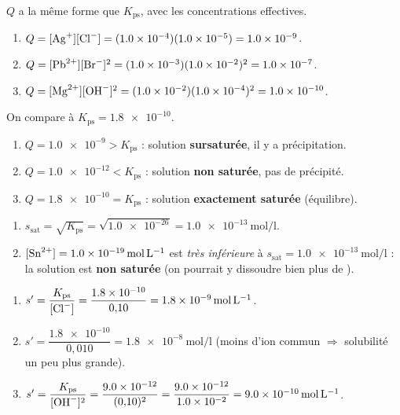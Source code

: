 \documentclass[11pt,a4paper]{article}
\begin{document}
\begin{corrige}
$Q$ a la même forme que $K_{\mathrm{ps}}$, avec les concentrations effectives.
\begin{enumerate}[label=\alph*)]
  \item $Q = [\ce{Ag+}][\ce{Cl-}] = (\num{1.0e-4})(\num{1.0e-5}) = \num{1.0e-9}$.
  \item $Q = [\ce{Pb^{2+}}][\ce{Br-}]^{2} = (\num{1.0e-3})(\num{1.0e-2})^{2} = \num{1.0e-7}$.
  \item $Q = [\ce{Mg^{2+}}][\ce{OH-}]^{2} = (\num{1.0e-2})(\num{1.0e-4})^{2} = \num{1.0e-10}$.
\end{enumerate}
\end{corrige}

\begin{corrige}
On compare à $K_{\mathrm{ps}}=\num{1.8e-10}$.
\begin{enumerate}[label=\alph*)]
  \item $Q=\num{1.0e-9} > K_{\mathrm{ps}}$ : solution \textbf{sursaturée}, il y a précipitation.
  \item $Q=\num{1.0e-12} < K_{\mathrm{ps}}$ : solution \textbf{non saturée}, pas de précipité.
  \item $Q=\num{1.8e-10} = K_{\mathrm{ps}}$ : solution \textbf{exactement saturée} (équilibre).
\end{enumerate}
\end{corrige}

\begin{corrige}
\begin{enumerate}[label=\alph*)]
  \item $s_{\text{sat}} = \sqrt{K_{\mathrm{ps}}} = \sqrt{\num{1.0e-26}} = \qty{1.0e-13}{\mole\per\litre}$.
  \item $[\ce{Sn^{2+}}]=\qty{1.0e-19}{\mole\per\litre}$ est \emph{très inférieure} à
        $s_{\text{sat}}=\qty{1.0e-13}{\mole\per\litre}$ : la solution est \textbf{non saturée} (on
        pourrait y dissoudre bien plus de ).
\end{enumerate}
\end{corrige}

\begin{corrige}[effet d'ion commun : $s'=K_{\mathrm{ps}}/C^{n}$]
\begin{enumerate}[label=\alph*)]
  \item $s' = \dfrac{K_{\mathrm{ps}}}{[\ce{Cl-}]} = \dfrac{\num{1.8e-10}}{0{,}10} = \qty{1.8e-9}{\mole\per\litre}$.
  \item $s' = \dfrac{\num{1.8e-10}}{0{,}010} = \qty{1.8e-8}{\mole\per\litre}$ (moins d'ion commun
        $\Rightarrow$ solubilité un peu plus grande).
  \item $s' = \dfrac{K_{\mathrm{ps}}}{[\ce{OH-}]^{2}} = \dfrac{\num{9.0e-12}}{(0{,}10)^{2}}
           = \dfrac{\num{9.0e-12}}{\num{1.0e-2}} = \qty{9.0e-10}{\mole\per\litre}$.
\end{enumerate}
\end{corrige}
\end{document}

